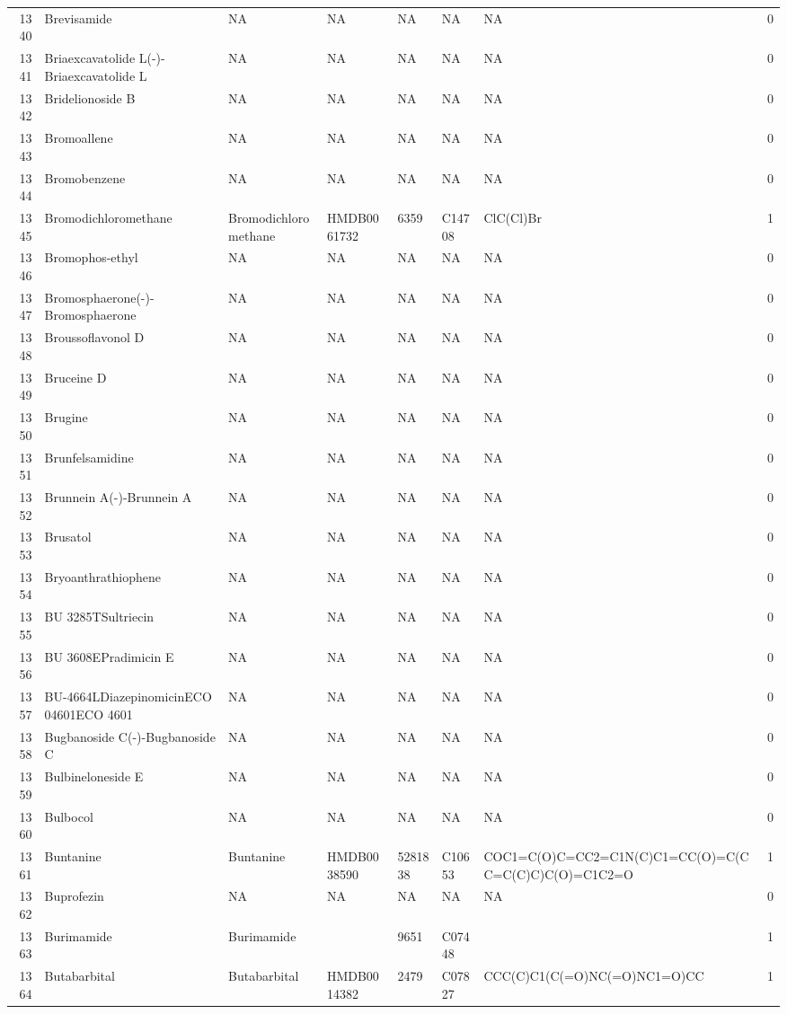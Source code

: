 \documentclass[a4paper]{article}
\begin{document}
\begin{longtable}{rlllllll}
  1340 & Brevisamide & NA & NA & NA & NA & NA & 0 \\ 
  1341 & Briaexcavatolide L(-)-Briaexcavatolide L & NA & NA & NA & NA & NA & 0 \\ 
  1342 & Bridelionoside B & NA & NA & NA & NA & NA & 0 \\ 
  1343 & Bromoallene & NA & NA & NA & NA & NA & 0 \\ 
  1344 & Bromobenzene & NA & NA & NA & NA & NA & 0 \\ 
  1345 & Bromodichloromethane & Bromodichloromethane & HMDB0061732 & 6359 & C14708 & ClC(Cl)Br & 1 \\ 
  1346 & Bromophos-ethyl & NA & NA & NA & NA & NA & 0 \\ 
  1347 & Bromosphaerone(-)-Bromosphaerone & NA & NA & NA & NA & NA & 0 \\ 
  1348 & Broussoflavonol D & NA & NA & NA & NA & NA & 0 \\ 
  1349 & Bruceine D & NA & NA & NA & NA & NA & 0 \\ 
  1350 & Brugine & NA & NA & NA & NA & NA & 0 \\ 
  1351 & Brunfelsamidine & NA & NA & NA & NA & NA & 0 \\ 
  1352 & Brunnein A(-)-Brunnein A & NA & NA & NA & NA & NA & 0 \\ 
  1353 & Brusatol & NA & NA & NA & NA & NA & 0 \\ 
  1354 & Bryoanthrathiophene & NA & NA & NA & NA & NA & 0 \\ 
  1355 & BU 3285TSultriecin & NA & NA & NA & NA & NA & 0 \\ 
  1356 & BU 3608EPradimicin E & NA & NA & NA & NA & NA & 0 \\ 
  1357 & BU-4664LDiazepinomicinECO 04601ECO 4601 & NA & NA & NA & NA & NA & 0 \\ 
  1358 & Bugbanoside C(-)-Bugbanoside C & NA & NA & NA & NA & NA & 0 \\ 
  1359 & Bulbineloneside E & NA & NA & NA & NA & NA & 0 \\ 
  1360 & Bulbocol & NA & NA & NA & NA & NA & 0 \\ 
  1361 & Buntanine & Buntanine & HMDB0038590 & 5281838 & C10653 & COC1=C(O)C=CC2=C1N(C)C1=CC(O)=C(CC=C(C)C)C(O)=C1C2=O & 1 \\ 
  1362 & Buprofezin & NA & NA & NA & NA & NA & 0 \\ 
  1363 & Burimamide & Burimamide &  & 9651 & C07448 &  & 1 \\ 
  1364 & Butabarbital & Butabarbital & HMDB0014382 & 2479 & C07827 & CCC(C)C1(C(=O)NC(=O)NC1=O)CC & 1 \\ 

\end{longtable}
\end{document}
